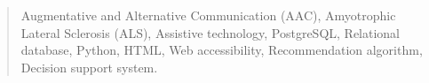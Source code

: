 \documentclass[a4paper,12pt,twoside]{memoir}
\begin{document}
\renewcommand*\abstractname{Keywords}
\begin{abstract}
Augmentative and Alternative Communication (AAC), Amyotrophic Lateral Sclerosis (ALS), Assistive technology, PostgreSQL, Relational database, Python, HTML, Web accessibility, Recommendation algorithm, Decision support system.
\end{abstract}

\clearpage

\tableofcontents

\clearpage

\listoffigures

\clearpage

\listoftables
\clearpage


\mainmatter
{} 
\setcounter{page}{7}










\nocite{*} 


\end{document}

